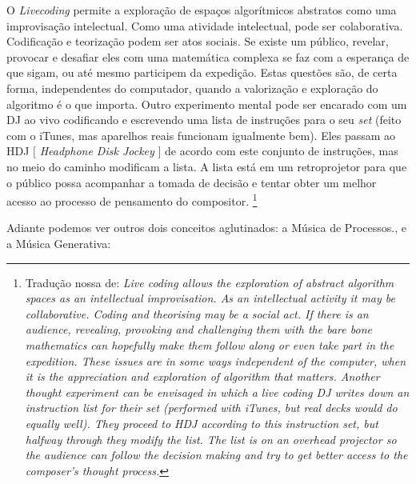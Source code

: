 \begin{citacao}
O \emph{Livecoding} permite a exploração de espaços algorítmicos abstratos como uma improvisação intelectual. Como uma atividade intelectual, pode ser colaborativa. Codificação e teorização podem ser atos sociais. Se existe um público, revelar, provocar e desafiar eles com uma matemática complexa se faz com a esperança de que sigam, ou até mesmo participem da expedição. Estas questões são, de certa forma, independentes do computador, quando a valorização e exploração do algoritmo é o que importa. Outro experimento mental pode ser encarado com um DJ ao vivo codificando e escrevendo uma lista de instruções para o seu \emph{set} (feito com o iTunes, mas aparelhos reais funcionam igualmente bem). Eles passam ao HDJ $[$ \emph{Headphone Disk Jockey} $]$ de acordo com este conjunto de instruções, mas no meio do caminho modificam a lista. A lista está em um retroprojetor para que o público possa acompanhar a tomada de decisão e tentar obter um melhor acesso ao processo de pensamento do compositor. \cite[p.~245]{ward_live_2004} \footnote{Tradução nossa de: \emph{Live coding allows the exploration of abstract algorithm spaces as an intellectual improvisation. As an intellectual activity it may be collaborative. Coding and theorising may be a social act. If there is an audience, revealing, provoking and challenging them with the bare bone mathematics can hopefully make them follow along or even take part in the expedition. These issues are in some ways independent of the computer, when it is the appreciation and exploration of algorithm that matters.   Another thought experiment can be envisaged in which a live coding DJ writes down an instruction list for their set (performed with iTunes, but real decks would do equally well). They proceed to HDJ according to this instruction set, but halfway through they modify the list. The list is on an overhead projector so the audience can follow the decision making and try to get better access to the composer’s thought process.}}
\end{citacao}

Adiante podemos ver outros dois conceitos aglutinados: a Música de Processos., e a Música Generativa:


